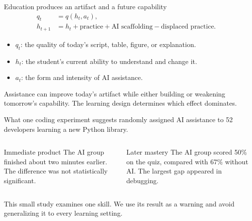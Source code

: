 \begin{frame}{Education produces an artifact and a future capability}
  \begin{align*}
    q_t &= q(h_t,a_t),\\
    h_{t+1} &= h_t + \text{practice}
      + \text{AI scaffolding} - \text{displaced practice}.
  \end{align*}

  \begin{itemize}
    \item $q_t$: the quality of today's script, table, figure, or explanation.
    \item $h_t$: the student's current ability to understand and change it.
    \item $a_t$: the form and intensity of AI assistance.
  \end{itemize}

  \vfill
  Assistance can improve today's artifact while either building or weakening
  tomorrow's capability. The learning design determines which effect dominates.
\end{frame}

\begin{frame}{What one coding experiment suggests}
  \citet{shen2026} randomly assigned AI assistance to 52 developers learning a
  new Python library.

  \begin{columns}[T,onlytextwidth]
      \begin{block}{Immediate product}
        The AI group finished about two minutes earlier. The difference was not
        statistically significant.
      \end{block}
      \begin{block}{Later mastery}
        The AI group scored 50\% on the quiz, compared with 67\% without AI. The
        largest gap appeared in debugging.
      \end{block}
  \end{columns}

  \vfill
  This small study examines one skill. We use its result as a warning and avoid
  generalizing it to every learning setting.
\end{frame}

